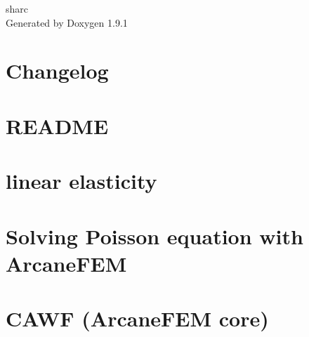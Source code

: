\let\mypdfximage\pdfximage\def\pdfximage{\immediate\mypdfximage}\documentclass[twoside]{book}
\newcommand{\+}{\discretionary{\mbox{\scriptsize$\hookleftarrow$}}{}{}}
\newcommand{\clearemptydoublepage}{%
  \newpage{\pagestyle{empty}\cleardoublepage}%
}
\begin{document}
\raggedbottom

\hypersetup{pageanchor=false,
             bookmarksnumbered=true,
             pdfencoding=unicode
            }
\begin{titlepage}
\vspace*{7cm}
\begin{center}%
{\Large sharc }\\
\vspace*{1cm}
{\large Generated by Doxygen 1.9.1}\\
\end{center}
\end{titlepage}
\clearemptydoublepage
{}
\tableofcontents
\clearemptydoublepage
{}
\hypersetup{pageanchor=true}

\chapter{Changelog}
\label{md__tmp_opencode_sharc_common_ArcGeoSim_changelog}

\chapter{README}
\label{md__tmp_opencode_sharc_README}

\chapter{linear elasticity}
\label{md__tmp_opencode_sharc_src_CAWF_Elasticity_Readme}

\chapter{Solving Poisson equation with Arcane\+FEM}
\label{md__tmp_opencode_sharc_src_CAWF_Poisson_Readme}

\chapter{CAWF (Arcane\+FEM core)}
\label{md__tmp_opencode_sharc_src_CAWF_README}

\end{document}

